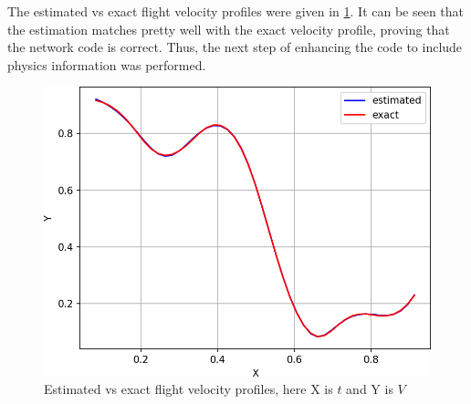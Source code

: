 \par{}
The estimated vs exact flight velocity profiles were given in \cref{velocity_profile_output}.
It can be seen that the estimation matches pretty well with the exact velocity
profile, proving that the network code is correct. Thus, the next step of
enhancing the code to include physics information was performed. \\

\begin{figure}
   \center
    \includegraphics[scale=0.7]{supportingFiles/02_results/02_velocity_profile_dataDriven/estimation.png}
    \caption{Estimated vs exact flight velocity profiles, here X is \(t\) and Y is \(V\)}
    \label{velocity_profile_output}
\end{figure}

